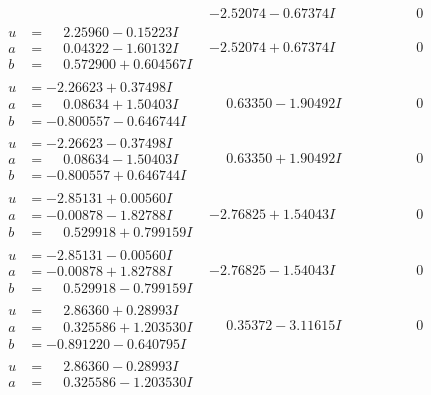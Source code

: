\documentclass[1p]{elsarticle_modified}
\theoremstyle{definition}
\begin{document}
$$\begin{array}{c|c|c}
 & -2.52074 - 0.67374 I & \phantom{-0.000000 } 0 \\ \hline\begin{aligned}
u &= \phantom{-}2.25960 - 0.15223 I \\
a &= \phantom{-}0.04322 - 1.60132 I \\
b &= \phantom{-}0.572900 + 0.604567 I\end{aligned}
 & -2.52074 + 0.67374 I & \phantom{-0.000000 } 0 \\ \hline\begin{aligned}
u &= -2.26623 + 0.37498 I \\
a &= \phantom{-}0.08634 + 1.50403 I \\
b &= -0.800557 - 0.646744 I\end{aligned}
 & \phantom{-}0.63350 - 1.90492 I & \phantom{-0.000000 } 0 \\ \hline\begin{aligned}
u &= -2.26623 - 0.37498 I \\
a &= \phantom{-}0.08634 - 1.50403 I \\
b &= -0.800557 + 0.646744 I\end{aligned}
 & \phantom{-}0.63350 + 1.90492 I & \phantom{-0.000000 } 0 \\ \hline\begin{aligned}
u &= -2.85131 + 0.00560 I \\
a &= -0.00878 - 1.82788 I \\
b &= \phantom{-}0.529918 + 0.799159 I\end{aligned}
 & -2.76825 + 1.54043 I & \phantom{-0.000000 } 0 \\ \hline\begin{aligned}
u &= -2.85131 - 0.00560 I \\
a &= -0.00878 + 1.82788 I \\
b &= \phantom{-}0.529918 - 0.799159 I\end{aligned}
 & -2.76825 - 1.54043 I & \phantom{-0.000000 } 0 \\ \hline\begin{aligned}
u &= \phantom{-}2.86360 + 0.28993 I \\
a &= \phantom{-}0.325586 + 1.203530 I \\
b &= -0.891220 - 0.640795 I\end{aligned}
 & \phantom{-}0.35372 - 3.11615 I & \phantom{-0.000000 } 0 \\ \hline\begin{aligned}
u &= \phantom{-}2.86360 - 0.28993 I \\
a &= \phantom{-}0.325586 - 1.203530 I \\

\end{aligned}
\end{array}$$
\end{document}
